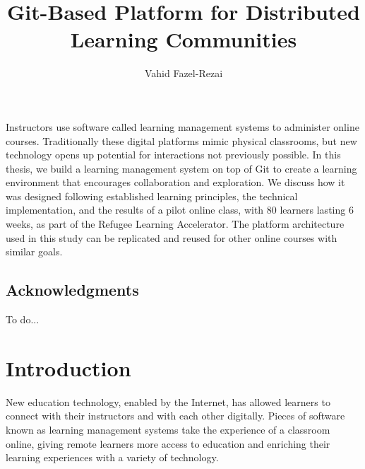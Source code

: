 \documentclass[12pt,twoside,vi]{mitthesis}
\newcommand{\wip}[1]{{\color{red} To do...}}
\begin{document}
\title{Git-Based Platform for Distributed Learning Communities}
\author{Vahid Fazel-Rezai}
\maketitle
\cleardoublepage
\setcounter{savepage}{\thepage}
\begin{abstractpage}
Instructors use software called learning management systems to administer online courses. Traditionally these digital platforms mimic physical classrooms, but new technology opens up potential for interactions not previously possible. In this thesis, we build a learning management system on top of Git to create a learning environment that encourages collaboration and exploration. We discuss how it was designed following established learning principles, the technical implementation, and the results of a pilot online class, with 80 learners lasting 6 weeks, as part of the Refugee Learning Accelerator. The platform architecture used in this study can be replicated and reused for other online courses with similar goals.
\end{abstractpage}
\cleardoublepage
\section*{Acknowledgments}
\wip{Acknowledgments...}

\tableofcontents

\newpage
\listoffigures

\newpage
\listoftables

\chapter{Introduction}

New education technology, enabled by the Internet, has allowed learners to connect with their instructors and with each other digitally. Pieces of software known as learning management systems take the experience of a classroom online, giving remote learners more access to education and enriching their learning experiences with a variety of technology.
\end{document}
